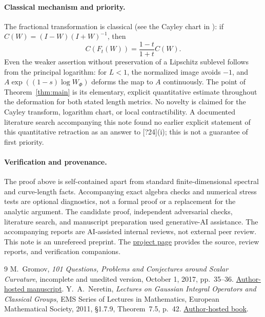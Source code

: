 \documentclass[11pt]{article}
\begin{document}
\paragraph{Classical mechanism and priority.}
The fractional transformation is classical (see the Cayley chart in \cite[\S1.7.9]{neretin}): if $C(W)=(I-W)(I+W)^{-1}$, then
\[
 C(F_t(W))=\frac{1-t}{1+t}C(W).
\]
Even the weaker assertion without preservation of a Lipschitz sublevel follows from the principal logarithm: for $L<1$, the normalized image avoids $-1$, and $A\exp((1-s)\log W_\Phi)$ deforms the map to $A$ continuously. The point of Theorem~\ref{thm:main} is its elementary, explicit quantitative estimate throughout the deformation for both stated length metrics. No novelty is claimed for the Cayley transform, logarithm chart, or local contractibility. A documented literature search accompanying this note found no earlier explicit statement of this quantitative retraction as an answer to [?24](i); this is not a guarantee of first priority.

\paragraph{Verification and provenance.}
The proof above is self-contained apart from standard finite-dimensional spectral and curve-length facts. Accompanying exact algebra checks and numerical stress tests are optional diagnostics, not a formal proof or a replacement for the analytic argument. The candidate proof, independent adversarial checks, literature search, and manuscript preparation used generative-AI assistance. The accompanying reports are AI-assisted internal reviews, not external peer review. This note is an unrefereed preprint. The \href{https://aleckriebel.github.io/Math/papers/gromov-unitary-lipschitz/}{project page} provides the source, review reports, and verification companions.

\begin{thebibliography}{9}
 M.~Gromov, \emph{101 Questions, Problems and Conjectures around Scalar Curvature}, incomplete and unedited version, October 1, 2017, pp.~35--36. \href{https://www.ihes.fr/~gromov/wp-content/uploads/2018/08/101-problemsOct1-2017.pdf}{Author-hosted manuscript}.
 Y.~A.~Neretin, \emph{Lectures on Gaussian Integral Operators and Classical Groups}, EMS Series of Lectures in Mathematics, European Mathematical Society, 2011, \S1.7.9, Theorem~7.5, p.~42. \href{https://www.mat.univie.ac.at/~neretin/lectures/ems.pdf}{Author-hosted book}.
\end{thebibliography}
\end{document}
